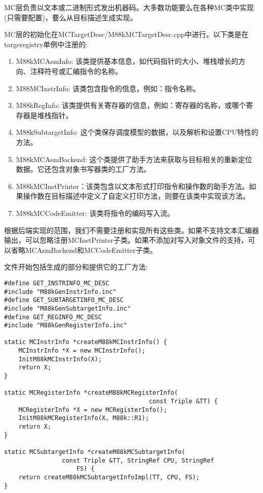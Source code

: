 MC层负责以文本或二进制形式发出机器码。大多数功能要么在各种MC类中实现(只需要配置)，要么从目标描述生成实现。\par

MC层的初始化在MCTargetDesc/M88kMCTargetDesc.cpp中进行。以下类是在targeregistry单例中注册的:\par

\begin{enumerate}
\item M88kMCAsmInfo: 该类提供基本信息，如代码指针的大小、堆栈增长的方向、注释符号或汇编指令的名称。

\item M88MCInstrInfo: 该类包含指令的信息，例如：指令名称。

\item M88kRegInfo: 该类提供有关寄存器的信息，例如：寄存器的名称，或哪个寄存器是堆栈指针。

\item M88kSubtargetInfo: 这个类保存调度模型的数据，以及解析和设置CPU特性的方法。

\item M88kMCAsmBackend: 这个类提供了助手方法来获取与目标相关的重新定位数据。它还包含对象书写器类的工厂方法。

\item M88kMCInstPrinter：该类包含以文本形式打印指令和操作数的助手方法。如果操作数在目标描述中定义了自定义打印方法，则要在该类中实现该方法。

\item M88kMCCodeEmitter: 该类将指令的编码写入流。
\end{enumerate}

根据后端实现的范围，我们不需要注册和实现所有这些类。如果不支持文本汇编器输出，可以忽略注册MCInstPrinter子类。如果不添加对写入对象文件的支持，可以省略MCAsmBackend和MCCodeEmitter子类。\par
 
文件开始包括生成的部分和提供它的工厂方法:\par

\begin{lstlisting}[caption={}]
#define GET_INSTRINFO_MC_DESC
#include "M88kGenInstrInfo.inc"
#define GET_SUBTARGETINFO_MC_DESC
#include "M88kGenSubtargetInfo.inc"
#define GET_REGINFO_MC_DESC
#include "M88kGenRegisterInfo.inc"

static MCInstrInfo *createM88kMCInstrInfo() {
	MCInstrInfo *X = new MCInstrInfo();
	InitM88kMCInstrInfo(X);
	return X;
}

static MCRegisterInfo *createM88kMCRegisterInfo(
										const Triple &TT) {
	MCRegisterInfo *X = new MCRegisterInfo();
	InitM88kMCRegisterInfo(X, M88k::R1);
	return X;
}

static MCSubtargetInfo *createM88kMCSubtargetInfo(
				const Triple &TT, StringRef CPU, StringRef
					FS) {
	return createM88kMCSubtargetInfoImpl(TT, CPU, FS);
}
\end{lstlisting}

